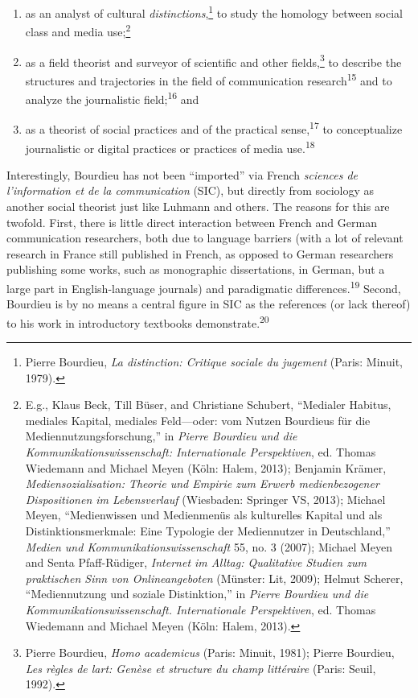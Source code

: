 \documentclass{tufte-handout}
\begin{document}
\begin{enumerate}
\item
  as an analyst of cultural \emph{distinctions},\footnote{Pierre
    Bourdieu, \emph{La distinction: Critique sociale du jugement}
    (Paris: Minuit, 1979).} to study the homology between social class
  and media use;\footnote{E.g., Klaus Beck, Till Büser, and Christiane
    Schubert, ``Medialer Habitus, mediales Kapital, mediales
    Feld---oder: vom Nutzen Bourdieus für die Mediennutzungsforschung,''
    in \emph{Pierre Bourdieu und die Kommunikationswissenschaft:
    Internationale Perspektiven}, ed. Thomas Wiedemann and Michael Meyen
    (Köln: Halem, 2013); Benjamin Krämer, \emph{Mediensozialisation:
    Theorie und Empirie zum Erwerb medienbezogener Dispositionen im
    Lebensverlauf} (Wiesbaden: Springer VS, 2013); Michael Meyen,
    ``Medienwissen und Medienmenüs als kulturelles Kapital und als
    Distinktionsmerkmale: Eine Typologie der Mediennutzer in
    Deutschland,'' \emph{Medien und Kommunikationswissenschaft} 55, no.
    3 (2007); Michael Meyen and Senta Pfaff-Rüdiger, \emph{Internet im
    Alltag: Qualitative Studien zum praktischen Sinn von
    Onlineangeboten} (Münster: Lit, 2009); Helmut Scherer,
    ``Mediennutzung und soziale Distinktion,'' in \emph{Pierre Bourdieu
    und die Kommunikationswissenschaft. Internationale Perspektiven},
    ed. Thomas Wiedemann and Michael Meyen (Köln: Halem, 2013).}
\item
  as a field theorist and surveyor of scientific and other
  fields,\footnote{Pierre Bourdieu, \emph{Homo academicus} (Paris:
    Minuit, 1981); Pierre Bourdieu, \emph{Les règles de
    l\textquotesingle art: Genèse et structure du champ littéraire}
    (Paris: Seuil, 1992).} to describe the structures and trajectories
  in the field of communication research\textsuperscript{15} and to analyze
  the journalistic field;\textsuperscript{16} and
\item
  as a theorist of social practices and of the practical
  sense,\textsuperscript{17} to conceptualize
  journalistic or digital practices or practices of media
  use.\textsuperscript{18}
\end{enumerate}

Interestingly, Bourdieu has not been ``imported'' via French
\emph{sciences de l'information et de la communication} (SIC), but
directly from sociology as another social theorist just like Luhmann and
others. The reasons for this are twofold. First, there is little direct
interaction between French and German communication researchers, both
due to language barriers (with a lot of relevant research in France
still published in French, as opposed to German researchers publishing
some works, such as monographic dissertations, in German, but a large
part in English-language journals) and paradigmatic
differences.\textsuperscript{19} Second, Bourdieu is by no
means a central figure in SIC as the references (or lack thereof) to his
work in introductory textbooks demonstrate.\textsuperscript{20}
\end{document}
